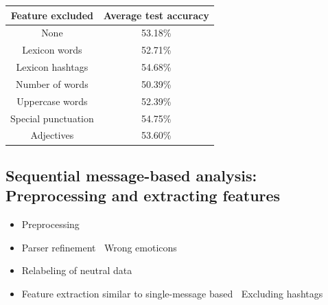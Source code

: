 \documentclass[
paper=128mm:96mm, %
fontsize=11pt, %
pagesize, %
parskip=half-, %
]{scrartcl} %
\newcommand{\red}[1]{\textit{\color{red}{#1}}}
\theoremstyle{mythmstyle} %
\begin{document}
\begin{table}[h]
\centering
\begin{tabular}{c c}
\toprule
\textbf{Feature excluded} & \textbf{Average test accuracy} \\
\midrule
None & 53.18\%\\
Lexicon words & 52.71\%\\
Lexicon hashtags & 54.68\%\\
Number of words & 50.39\%\\
Uppercase words & 52.39\%\\
Special punctuation & 54.75\%\\
Adjectives & 53.60\%\\
\bottomrule 
\end{tabular}
\end{table}



\clearpage


\subsection*{Sequential message-based analysis: Preprocessing and extracting features}

\begin{itemize}
\item Preprocessing
\item Parser refinement
\subitem \textbullet $\:$ Wrong emoticons
\item Relabeling of neutral data
\item Feature extraction similar to single-message based
\subitem \textbullet $\:$ Excluding hashtags

\end{itemize}

\clearpage
\end{document}
